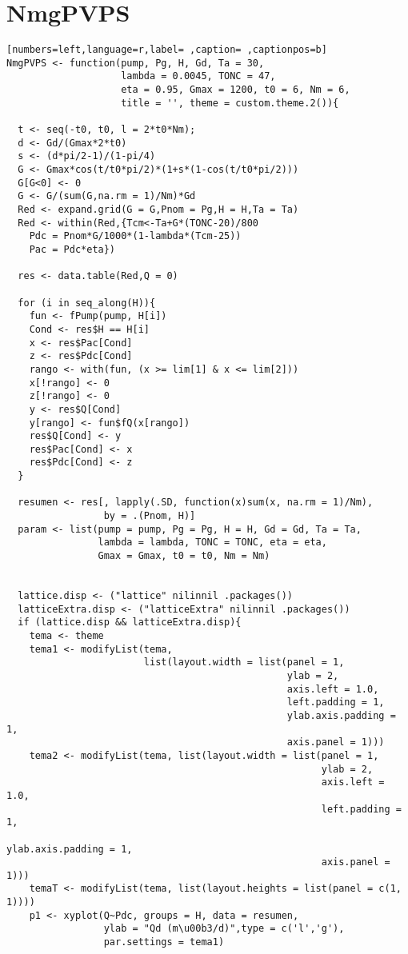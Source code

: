 \section{NmgPVPS}
\label{sec:org5bae544}
\begin{lstlisting}[numbers=left,language=r,label= ,caption= ,captionpos=b]
NmgPVPS <- function(pump, Pg, H, Gd, Ta = 30,
                    lambda = 0.0045, TONC = 47,
                    eta = 0.95, Gmax = 1200, t0 = 6, Nm = 6,
                    title = '', theme = custom.theme.2()){

  t <- seq(-t0, t0, l = 2*t0*Nm);
  d <- Gd/(Gmax*2*t0)
  s <- (d*pi/2-1)/(1-pi/4)
  G <- Gmax*cos(t/t0*pi/2)*(1+s*(1-cos(t/t0*pi/2)))
  G[G<0] <- 0
  G <- G/(sum(G,na.rm = 1)/Nm)*Gd
  Red <- expand.grid(G = G,Pnom = Pg,H = H,Ta = Ta)
  Red <- within(Red,{Tcm<-Ta+G*(TONC-20)/800
    Pdc = Pnom*G/1000*(1-lambda*(Tcm-25))
    Pac = Pdc*eta})                    

  res <- data.table(Red,Q = 0)

  for (i in seq_along(H)){
    fun <- fPump(pump, H[i])
    Cond <- res$H == H[i]
    x <- res$Pac[Cond]
    z <- res$Pdc[Cond]
    rango <- with(fun, (x >= lim[1] & x <= lim[2])) 
    x[!rango] <- 0
    z[!rango] <- 0
    y <- res$Q[Cond]
    y[rango] <- fun$fQ(x[rango])
    res$Q[Cond] <- y
    res$Pac[Cond] <- x
    res$Pdc[Cond] <- z
  }

  resumen <- res[, lapply(.SD, function(x)sum(x, na.rm = 1)/Nm),
                 by = .(Pnom, H)]
  param <- list(pump = pump, Pg = Pg, H = H, Gd = Gd, Ta = Ta,
                lambda = lambda, TONC = TONC, eta = eta,
                Gmax = Gmax, t0 = t0, Nm = Nm)


  lattice.disp <- ("lattice" nilinnil .packages())
  latticeExtra.disp <- ("latticeExtra" nilinnil .packages())
  if (lattice.disp && latticeExtra.disp){
    tema <- theme
    tema1 <- modifyList(tema,
                        list(layout.width = list(panel = 1,
                                                 ylab = 2,
                                                 axis.left = 1.0,
                                                 left.padding = 1,
                                                 ylab.axis.padding = 1,
                                                 axis.panel = 1)))
    tema2 <- modifyList(tema, list(layout.width = list(panel = 1,
                                                       ylab = 2,
                                                       axis.left = 1.0,
                                                       left.padding = 1,
                                                       ylab.axis.padding = 1,
                                                       axis.panel = 1)))
    temaT <- modifyList(tema, list(layout.heights = list(panel = c(1, 1))))
    p1 <- xyplot(Q~Pdc, groups = H, data = resumen,
                 ylab = "Qd (m\u00b3/d)",type = c('l','g'),
                 par.settings = tema1)


\end{lstlisting}
